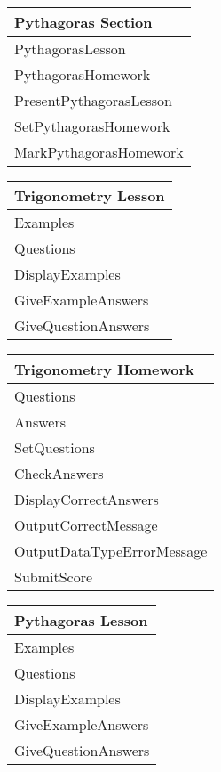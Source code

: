 \begin{center}
\begin{tabular}{|p{5cm}|} \hline
Pythagoras Section \\ \hline
PythagorasLesson \\
PythagorasHomework \\ \hline
PresentPythagorasLesson \\
SetPythagorasHomework \\
MarkPythagorasHomework \\ \hline
\end{tabular}
\end{center}

\begin{center}
\begin{tabular}{|p{5cm}|} \hline
Trigonometry Lesson \\ \hline
Examples \\
Questions \\ \hline
DisplayExamples \\
GiveExampleAnswers \\
GiveQuestionAnswers \\ \hline
\end{tabular}
\end{center}

\begin{center}
\begin{tabular}{|p{5cm}|} \hline
Trigonometry Homework \\ \hline
Questions \\
Answers \\ \hline
SetQuestions \\
CheckAnswers \\
DisplayCorrectAnswers \\
OutputCorrectMessage \\
OutputDataTypeErrorMessage \\
SubmitScore \\ \hline
\end{tabular}
\end{center}

\begin{center}
\begin{tabular}{|p{5cm}|} \hline
Pythagoras Lesson \\ \hline
Examples \\
Questions \\ \hline
DisplayExamples \\
GiveExampleAnswers \\
GiveQuestionAnswers \\ \hline
\end{tabular}
\end{center}


